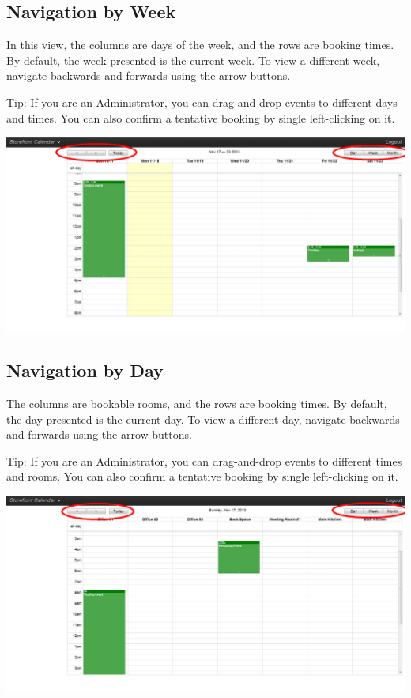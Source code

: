 \newpage


\subsection{Navigation by Week}

In this view, the columns are days of the week, and the rows are booking times. By default, the week presented is the current week. To view a different week, navigate backwards and forwards using the arrow buttons.

Tip: If you are an Administrator, you can drag-and-drop events to different days and times. You can also confirm a tentative booking by single left-clicking on it.

\includegraphics[width=\linewidth]{screenshots/img_week}


\newpage


\subsection{Navigation by Day}

The columns are bookable rooms, and the rows are booking times. By default, the day presented is the current day. To view a different day, navigate backwards and forwards using the arrow buttons.

Tip: If you are an Administrator, you can drag-and-drop events to different times and rooms. You can also confirm a tentative booking by single left-clicking on it.

\includegraphics[width=\linewidth]{screenshots/img_day}



